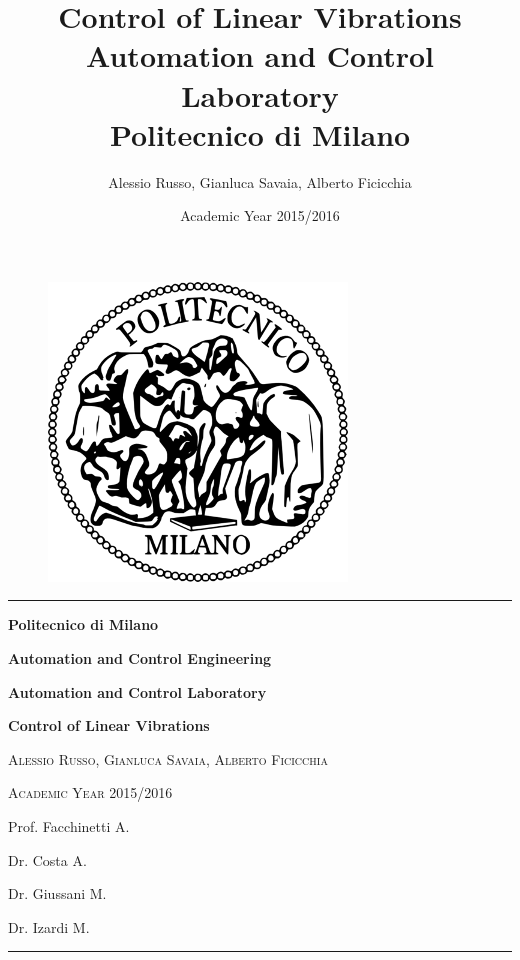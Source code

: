 \documentclass[10pt,a4paper,titlepage]{report}
\author{Alessio Russo, Gianluca Savaia, Alberto Ficicchia}
\title{Control of Linear Vibrations \\
\Large Automation and Control Laboratory \\
 Politecnico di Milano}
\date{Academic Year 2015/2016}
\begin{document}
\begin{titlepage}

\centering		
\vspace{3cm}
\begin{figure}[!h]
\centering
  \includegraphics[scale=0.7]{img/logo.png} 
\end{figure}
\rule{\textwidth}{1pt}
 \par 
\vspace{2cm}
{\Large\bfseries Politecnico di Milano \par}
{\Large\bfseries Automation and Control Engineering\par}
\vspace{2cm}
{\Large\bfseries Automation and Control Laboratory\par}
{\huge\bfseries Control of Linear Vibrations\par}
\vspace{0.3cm}
{\large\scshape Alessio Russo, Gianluca Savaia, Alberto Ficicchia\par}
\vspace{0.3cm}
{\scshape Academic Year 2015/2016\par}
\vspace{3.5cm}
\hspace{12cm}
{ Prof. Facchinetti A.\par}
\hspace{11cm}
{ Dr. Costa A.\par}
\hspace{11.5cm}
{ Dr. Giussani M.\par}
\hspace{11.1cm}
{ Dr. Izardi M.\par}
\rule{\textwidth}{1pt}
\end{titlepage}
\tableofcontents
\end{document}
